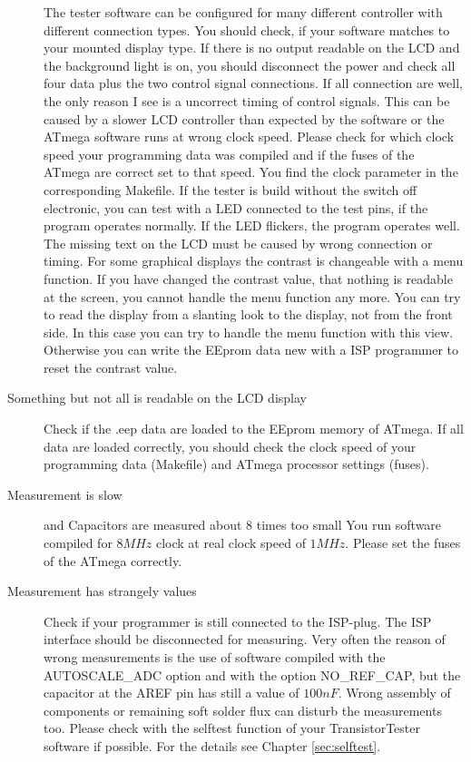 \begin{description}
The tester software can be configured for many different controller with different connection
types. You should check, if your software matches to your mounted display type.
If there is no output readable on the LCD and the background light is on,
you should disconnect the power and check all four data plus the two control signal connections.
If all connection are well, the only reason I see is a uncorrect timing of
control signals. This can be caused by a slower LCD controller than expected by
the software or the ATmega software runs at wrong clock speed. Please check for which
clock speed your programming data was compiled  and if the fuses of the
ATmega are correct set to that speed. You find the clock parameter in the corresponding
Makefile.
If the tester is build without the switch off electronic, you can test with
a LED connected to the test pins, if the program operates normally.
If the LED flickers, the program operates well. The missing text on the
LCD must be caused by wrong connection or timing.
For some graphical displays the contrast is changeable with a menu function.
If you have changed the contrast value, that nothing is readable at the screen,
you cannot handle the menu function any more. You can try to read the display
from a slanting look to the display, not from the front side.
In this case you can try to handle the menu function with this view.
Otherwise you can write the EEprom data new with a ISP programmer to reset the contrast value.


\item[Something but not all is readable on the LCD display]
Check if the .eep data are loaded to the EEprom memory of ATmega.
If all data are loaded correctly, you should check the clock speed of your
programming data (Makefile) and ATmega processor settings (fuses).

\item[Measurement is slow] and Capacitors are measured about 8 times too small
You run software compiled for \(8MHz\) clock at real clock speed of \(1MHz\).
Please set the fuses of the ATmega correctly.

\item[Measurement has strangely values]
Check if your programmer is still connected to the ISP-plug.
The ISP interface should be disconnected for measuring.
Very often the reason of wrong measurements is the use of software compiled with
the AUTOSCALE\_ADC option and with the option NO\_REF\_CAP, but the capacitor
at the AREF pin has still a value of \(100nF\).
Wrong assembly of components or remaining soft solder flux can disturb the 
measurements too. Please check with the selftest function of your TransistorTester software
if possible. For the details see Chapter \ref{sec:selftest}.


\end{description}

